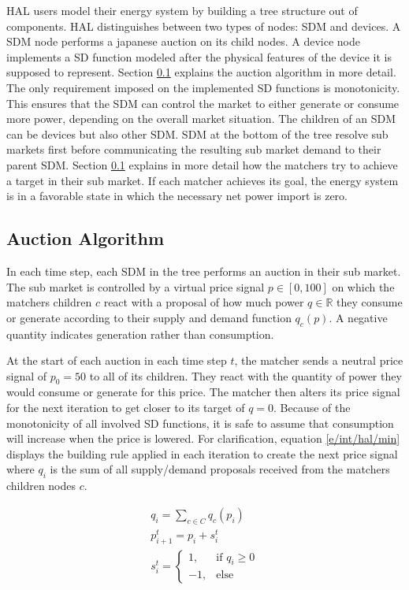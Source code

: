 \documentclass[a4paper,12pt]{book}
\theoremstyle{break}
\begin{document}
HAL users model their energy system by building a tree structure out of components. HAL distinguishes between two types of nodes: \ac{SDM} and devices.
A \ac{SDM} node performs a japanese auction on its child nodes. A device node implements a \ac{SD} function modeled after the physical features of the device it is supposed to represent. Section \ref{s/intr/hal/auction} explains the auction algorithm in more detail.
The only requirement imposed on the implemented \ac{SD} functions is monotonicity. This ensures that the \ac{SDM} can control the market to either generate or consume more power, depending on the overall market situation.
The children of an \ac{SDM} can be devices but also other \ac{SDM}. \ac{SDM} at the bottom of the tree resolve sub markets first before communicating the resulting sub market demand to their parent \ac{SDM}. 
Section \ref{s/intr/hal/auction} explains in more detail how the matchers try to achieve a target in their sub market.
If each matcher achieves its goal, the energy system is in a favorable state in which the necessary net power import is zero. \cite{schedulingMilp}

\subsection{Auction Algorithm}\label{s/intr/hal/auction}
In each time step, each \ac{SDM} in the tree performs an auction in their sub market.
The sub market is controlled by a virtual price signal $p \in [0, 100]$ on which the matchers children $c$ react with a proposal of how much power $q \in \mathbb{R}$ they consume or generate according to their supply and demand function $q_c(p)$. A negative quantity indicates generation rather than consumption. 

At the start of each auction in each time step $t$, the matcher sends a neutral price signal of $p_0=50$ to all of its children. They react with the quantity of power they would consume or generate for this price. 
The matcher then alters its price signal for the next iteration to get closer to its target of $q=0$. 
Because of the monotonicity of all involved \ac{SD} functions, it is safe to assume that consumption will increase when the price is lowered.
For clarification, equation \ref{e/int/hal/min} displays the building rule applied in each iteration to create the next price signal where $q_i$ is the sum of all supply/demand proposals received from the matchers children nodes $c$.

\begin{equation}\label{e/int/hal/min}
\begin{split}
q_i = \sum_{c \in C} q_c(p_i)\\
p^t_{i+1}  = p_i + s^t_i \\
s^t_i = \begin{cases}
1 ,& \text{if } q_i \geq 0\\
-1,& \text{else}
\end{cases} \\
\end{split}
\end{equation}
\end{document}
